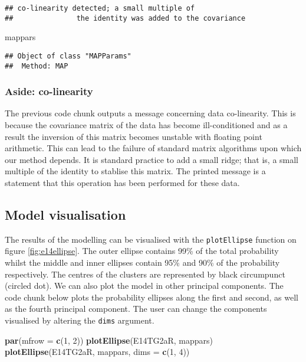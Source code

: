 \documentclass[]{article}
\newenvironment{Shaded}{\begin{snugshade}}{\end{snugshade}}
\newcommand{\KeywordTok}[1]{\textcolor[rgb]{0.13,0.29,0.53}{\textbf{{#1}}}}
\newcommand{\DataTypeTok}[1]{\textcolor[rgb]{0.13,0.29,0.53}{{#1}}}
\newcommand{\DecValTok}[1]{\textcolor[rgb]{0.00,0.00,0.81}{{#1}}}
\newcommand{\NormalTok}[1]{{#1}}
\begin{document}
\begin{verbatim}
## co-linearity detected; a small multiple of
##               the identity was added to the covariance
\end{verbatim}

\begin{Shaded}
\begin{Highlighting}[]
\NormalTok{mappars}
\end{Highlighting}
\end{Shaded}

\begin{verbatim}
## Object of class "MAPParams"
##  Method: MAP
\end{verbatim}

\subsubsection*{Aside: co-linearity}\label{aside-co-linearity}

The previous code chunk outputs a message concerning data co-linearity.
This is because the covariance matrix of the data has become
ill-conditioned and as a result the inversion of this matrix becomes
unstable with floating point arithmetic. This can lead to the failure of
standard matrix algorithms upon which our method depends. It is standard
practice to add a small ridge; that is, a small multiple of the identity
to stablise this matrix. The printed message is a statement that this
operation has been performed for these data.

\subsection{Model visualisation}\label{model-visualisation}

The results of the modelling can be visualised with the
\texttt{plotEllipse} function on figure \ref{fig:e14ellipse}. The outer
ellipse contains 99\% of the total probability whilst the middle and
inner ellipses contain 95\% and 90\% of the probability respectively.
The centres of the clusters are represented by black circumpunct
(circled dot). We can also plot the model in other principal components.
The code chunk below plots the probability ellipses along the first and
second, as well as the fourth principal component. The user can change
the components visualised by altering the \texttt{dims} argument.

\begin{Shaded}
\begin{Highlighting}[]
\KeywordTok{par}\NormalTok{(}\DataTypeTok{mfrow =} \KeywordTok{c}\NormalTok{(}\DecValTok{1}\NormalTok{, }\DecValTok{2}\NormalTok{))}
\KeywordTok{plotEllipse}\NormalTok{(E14TG2aR, mappars)}
\KeywordTok{plotEllipse}\NormalTok{(E14TG2aR, mappars, }\DataTypeTok{dims =} \KeywordTok{c}\NormalTok{(}\DecValTok{1}\NormalTok{, }\DecValTok{4}\NormalTok{))}
\end{Highlighting}
\end{Shaded}
\end{document}
